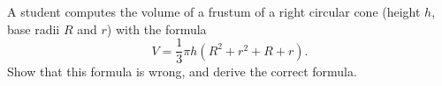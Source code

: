 A student computes the volume of a frustum of a right circular cone (height $h$, base radii $R$ and $r$) with the formula
\[
V=\dfrac{1}{3}\pi h\left(R^2+r^2+R+r\right).
\]
Show that this formula is wrong, and derive the correct formula.
